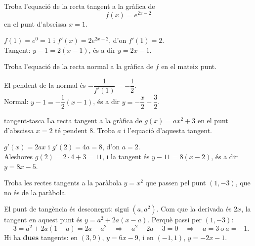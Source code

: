 \begin{apartats}

Troba l'equació de la recta tangent a la gràfica de
\[
f(x)=e^{2x-2}
\]
en el punt d'abscissa $x=1$.

\begin{solucio}
$f(1)=e^{0}=1$ i $f'(x)=2e^{2x-2}$, d'on $f'(1)=2$.\\
Tangent: $y-1=2(x-1)$, és a dir $y=2x-1$.
\end{solucio}

\begin{nomesllarg}
Troba l'equació de la recta normal a la gràfica de $f$ en el mateix punt.

\begin{solucio}
El pendent de la normal és $-\dfrac{1}{f'(1)}=-\dfrac12$.\\
Normal: $y-1=-\dfrac12(x-1)$, és a dir $y=-\dfrac{x}{2}+\dfrac32$.
\end{solucio}
\end{nomesllarg}

\begin{tria}{tangent-tasca}
La recta tangent a la gràfica de $g(x)=ax^2+3$ en el punt d'abscissa $x=2$ té pendent $8$.
Troba $a$ i l'equació d'aquesta tangent.

\begin{solucio}
$g'(x)=2ax$ i $g'(2)=4a=8$, d'on $\boxed{a=2}$.\\
Aleshores $g(2)=2\cdot4+3=11$, i la tangent és $y-11=8(x-2)$, és a dir $y=8x-5$.
\end{solucio}

Troba les rectes tangents a la paràbola $y=x^2$ que passen pel punt $(1,-3)$, que no és de la
paràbola.

\begin{solucio}
El punt de tangència és desconegut: sigui $(a,a^2)$. Com que la derivada és $2x$, la tangent en
aquest punt és $y=a^2+2a(x-a)$. Perquè passi per $(1,-3)$:
\[
-3=a^2+2a(1-a)=2a-a^2\quad\Longrightarrow\quad a^2-2a-3=0\quad\Longrightarrow\quad a=3\ \text{o}\ a=-1 .
\]
Hi ha \textbf{dues} tangents: en $(3,9)$, $y=6x-9$, i en $(-1,1)$, $y=-2x-1$.
\end{solucio}
\end{tria}

\end{apartats}
